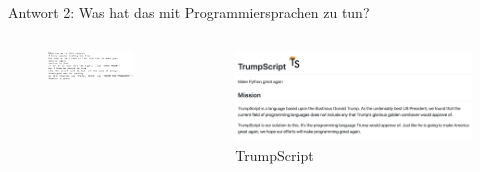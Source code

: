              \begin{frame}{Antwort 2: Was hat das mit Programmiersprachen zu tun?}
                \begin{columns}
                    \begin{column}{0.4\linewidth}
                        \begin{figure}
                            \centering
                            \includegraphics[width=\linewidth,height=0.5\textheight,keepaspectratio]{chapters/04_programming_languages/figures/trump_code.png}
                        \end{figure}
                    \end{column}
                    \begin{column}{0.6\linewidth}
                        \begin{figure}
                            \centering
                            \includegraphics[width=\linewidth,height=0.5\textheight,keepaspectratio]{chapters/04_programming_languages/figures/trump.png}
                            \caption{TrumpScript \cite{trumpscript}}
                        \end{figure}
                    \end{column}
                \end{columns}
                
            \end{frame}
            
